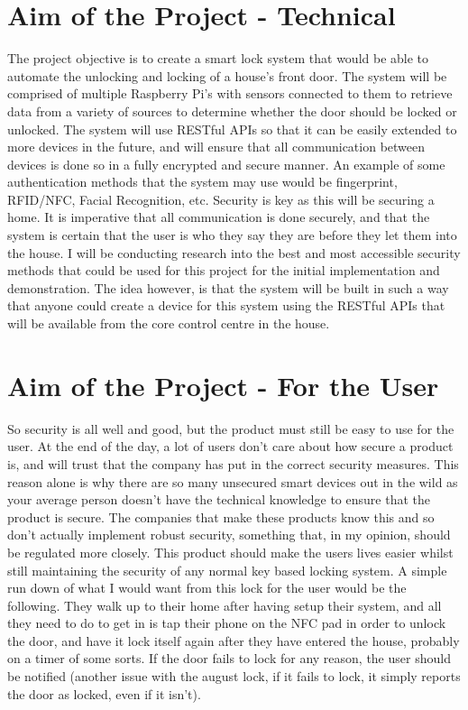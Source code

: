 \documentclass[10pt, a4paper]{article}
\begin{document}
\section{Aim of the Project - Technical}
The project objective is to create a smart lock system that would be able to automate the unlocking and locking of a house's front door. The system will be comprised of multiple Raspberry Pi's with sensors connected to them to retrieve data from a variety of sources to determine whether the door should be locked or unlocked. The system will use RESTful APIs so that it can be easily extended to more devices in the future, and will ensure that all communication between devices is done so in a fully encrypted and secure manner. An example of some authentication methods that the system may use would be fingerprint, RFID/NFC, Facial Recognition, etc.
\newline
\newline
Security is key as this will be securing a home. It is imperative that all communication is done securely, and that the system is certain that the user is who they say they are before they let them into the house. I will be conducting research into the best and most accessible security methods that could be used for this project for the initial implementation and demonstration. The idea however, is that the system will be built in such a way that anyone could create a device for this system using the RESTful APIs that will be available from the core control centre in the house.

\section{Aim of the Project - For the User}
So security is all well and good, but the product must still be easy to use for the user. At the end of the day, a lot of users don't care about how secure a product is, and will trust that the company has put in the correct security measures. This reason alone is why there are so many unsecured smart devices out in the wild as your average person doesn't have the technical knowledge to ensure that the product is secure. The companies that make these products know this and so don't actually implement robust security, something that, in my opinion, should be regulated more closely. This product should make the users lives easier whilst still maintaining the security of any normal key based locking system.
\newline
\newline
A simple run down of what I would want from this lock for the user would be the following. They walk up to their home after having setup their system, and all they need to do to get in is tap their phone on the NFC pad in order to unlock the door, and have it lock itself again after they have entered the house, probably on a timer of some sorts. If the door fails to lock for any reason, the user should be notified (another issue with the august lock, if it fails to lock, it simply reports the door as locked, even if it isn't).
\end{document}
